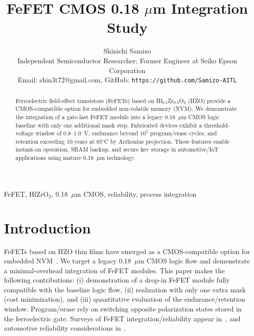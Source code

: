 \documentclass[conference]{IEEEtran}
\begin{document}
\title{FeFET CMOS 0.18 $\mu$m Integration Study}

\author{
Shinichi Samizo \\
Independent Semiconductor Researcher; Former Engineer at Seiko Epson Corporation \\
Email: shin3t72@gmail.com, GitHub: \texttt{https://github.com/Samizo-AITL}
}

\maketitle

\begin{abstract}
Ferroelectric field-effect transistors (FeFETs) based on Hf$_{0.5}$Zr$_{0.5}$O$_2$ (HZO) provide a CMOS-compatible option for embedded non-volatile memory (NVM). We demonstrate the integration of a gate-last FeFET module into a legacy 0.18~$\mu$m CMOS logic baseline with only one additional mask step. Fabricated devices exhibit a threshold-voltage window of 0.8–1.0~V, endurance beyond $10^5$ program/erase cycles, and retention exceeding 10 years at 85$^\circ$C by Arrhenius projection. These features enable instant-on operation, SRAM backup, and secure key storage in automotive/IoT applications using mature 0.18~$\mu$m technology.
\end{abstract}

\begin{IEEEkeywords}
FeFET, HfZrO$_2$, 0.18~$\mu$m CMOS, reliability, process integration
\end{IEEEkeywords}

\section{Introduction}
FeFETs based on HZO thin films have emerged as a CMOS-compatible option for embedded NVM~\cite{BoeScke2011,Muller2012,Schenk2019}. We target a legacy 0.18~$\mu$m CMOS logic flow and demonstrate a minimal-overhead integration of FeFET modules. This paper makes the following contributions: (i) demonstration of a drop-in FeFET module fully compatible with the baseline logic flow, (ii) realization with only one extra mask (cost minimization), and (iii) quantitative evaluation of the endurance/retention window. Program/erase rely on switching opposite polarization states stored in the ferroelectric gate. Surveys of FeFET integration/reliability appear in~\cite{Muller2015,Park2020}, and automotive reliability considerations in~\cite{Nakamura2003}.
\end{document}
